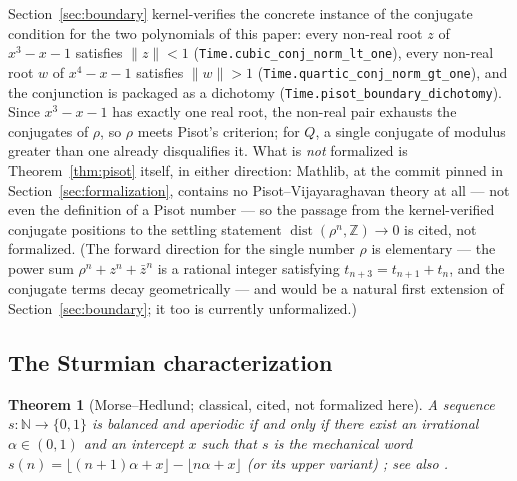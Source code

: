 \documentclass[11pt]{amsart}
\theoremstyle{plain}
\newtheorem{theorem}{Theorem}[section]
\theoremstyle{definition}
\theoremstyle{remark}
\begin{document}
Section~\ref{sec:boundary} kernel-verifies the concrete instance of the conjugate condition for the two polynomials of this paper: every non-real root $z$ of $x^3 - x - 1$ satisfies $\lVert z \rVert < 1$ (\texttt{Time.cubic\_conj\_norm\_lt\_one}), every non-real root $w$ of $x^4 - x - 1$ satisfies $\lVert w \rVert > 1$ (\texttt{Time.quartic\_conj\_norm\_gt\_one}), and the conjunction is packaged as a dichotomy (\texttt{Time.pisot\_boundary\_dichotomy}). Since $x^3 - x - 1$ has exactly one real root, the non-real pair exhausts the conjugates of $\rho$, so $\rho$ meets Pisot's criterion; for $Q$, a single conjugate of modulus greater than one already disqualifies it. What is \emph{not} formalized is Theorem~\ref{thm:pisot} itself, in either direction: Mathlib, at the commit pinned in Section~\ref{sec:formalization}, contains no Pisot--Vijayaraghavan theory at all --- not even the definition of a Pisot number --- so the passage from the kernel-verified conjugate positions to the settling statement $\operatorname{dist}(\rho^n, \mathbb{Z}) \to 0$ is cited, not formalized. (The forward direction for the single number $\rho$ is elementary --- the power sum $\rho^n + z^n + \bar{z}^n$ is a rational integer satisfying $t_{n+3} = t_{n+1} + t_n$, and the conjugate terms decay geometrically --- and would be a natural first extension of Section~\ref{sec:boundary}; it too is currently unformalized.)

\subsection{The Sturmian characterization}

\begin{theorem}[Morse--Hedlund; classical, cited, not formalized here]
\label{thm:morsehedlund}
A sequence $s : \mathbb{N} \to \{0,1\}$ is balanced and aperiodic if and only if there exist an irrational $\alpha \in (0,1)$ and an intercept $x$ such that $s$ is the mechanical word $s(n) = \lfloor (n+1)\alpha + x \rfloor - \lfloor n\alpha + x \rfloor$ (or its upper variant) \cite{morsehedlund1940}; see also \cite{lothaire2002}.
\end{theorem}
\end{document}
